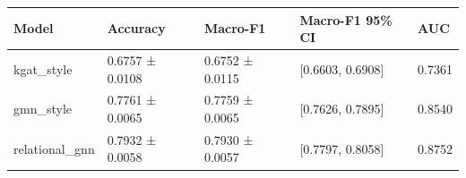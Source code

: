 \begin{tabular}{lllll}
\toprule
Model & Accuracy & Macro-F1 & Macro-F1 95\% CI & AUC \\
\midrule
kgat\_style & 0.6757 ± 0.0108 & 0.6752 ± 0.0115 & [0.6603, 0.6908] & 0.7361 \\
gmn\_style & 0.7761 ± 0.0065 & 0.7759 ± 0.0065 & [0.7626, 0.7895] & 0.8540 \\
relational\_gnn & 0.7932 ± 0.0058 & 0.7930 ± 0.0057 & [0.7797, 0.8058] & 0.8752 \\
\bottomrule
\end{tabular}
